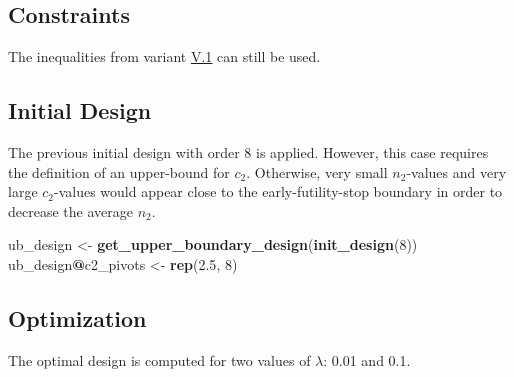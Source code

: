 \documentclass[
]{book}
\newenvironment{Shaded}{\begin{snugshade}}{\end{snugshade}}
\newcommand{\DataTypeTok}[1]{\textcolor[rgb]{0.13,0.29,0.53}{#1}}
\newcommand{\DecValTok}[1]{\textcolor[rgb]{0.00,0.00,0.81}{#1}}
\newcommand{\FloatTok}[1]{\textcolor[rgb]{0.00,0.00,0.81}{#1}}
\newcommand{\KeywordTok}[1]{\textcolor[rgb]{0.13,0.29,0.53}{\textbf{#1}}}
\newcommand{\NormalTok}[1]{#1}
\newcommand{\OperatorTok}[1]{\textcolor[rgb]{0.81,0.36,0.00}{\textbf{#1}}}
\newcommand{\StringTok}[1]{\textcolor[rgb]{0.31,0.60,0.02}{#1}}
\begin{document}
\hypertarget{constraints-13}{%
\subsection{Constraints}\label{constraints-13}}

The inequalities from variant \protect\hyperlink{variantV_1}{V.1} can still be used.

\hypertarget{initial-design-11}{%
\subsection{Initial Design}\label{initial-design-11}}

The previous initial design with order \(8\) is applied.
However, this case requires the definition of an upper-bound for \(c_2\).
Otherwise, very small \(n_2\)-values and very large \(c_2\)-values would
appear close to the early-futility-stop boundary in order to
decrease the average \(n_2\).

\begin{Shaded}
\begin{Highlighting}[]
\NormalTok{ub_design <-}\StringTok{ }\KeywordTok{get_upper_boundary_design}\NormalTok{(}\KeywordTok{init_design}\NormalTok{(}\DecValTok{8}\NormalTok{))}
\NormalTok{ub_design}\OperatorTok{@}\NormalTok{c2_pivots <-}\StringTok{ }\KeywordTok{rep}\NormalTok{(}\FloatTok{2.5}\NormalTok{, }\DecValTok{8}\NormalTok{)}
\end{Highlighting}
\end{Shaded}

\hypertarget{optimization-12}{%
\subsection{Optimization}\label{optimization-12}}

The optimal design is computed for two values of \(\lambda\): 0.01 and 0.1.

\begin{Shaded}
\end{Shaded}
\end{document}
